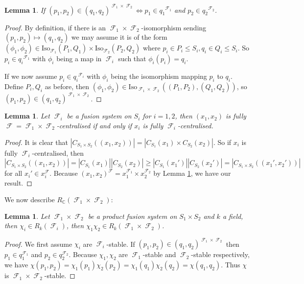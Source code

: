 \documentclass[12pt]{article}
\DeclareMathOperator{\C}{\mathbb{C}}
\DeclareMathOperator{\sF}{\mathcal{F}}
\theoremstyle{plain}
\newtheorem{lem}[thm]{Lemma}
\theoremstyle{definition}
\begin{document}
\begin{lem}\label{product classes}
If $(p_1, p_2) \in (q_1, q_2)^{\sF_1 \times \sF_2} \iff p_1 \in {q_1}^{\sF_1}$ and $p_2 \in {q_2}^{\sF_2}$.
\end{lem}
\begin{proof} By definition, if there is an $\sF_1\times\sF_2$-isomorphism sending $(p_1, p_2) \mapsto (q_1, q_2)$ we may assume it is of the form $(\phi_1, \phi_2) \in \text{Iso}_{\sF_1}(P_1, Q_1)\times\text{Iso}_{\sF_2}(P_2, Q_2)$ 
where $p_i \in P_i \leq S_i, q_i \in Q_i \leq S_i$. So $p_i \in {q_i}^{\sF_1}$ with $\phi_i$ being a map in $\sF_i$ such that $\phi_i(p_i) = q_i$.

If we now assume $p_i \in {q_i}^{\sF_i}$ with $\phi_i$ being the isomorphism mapping $p_i$ to $q_i$. Define $P_i, Q_i$ as before, 
then $(\phi_1, \phi_2) \in \text{Iso}_{\sF_1 \times \sF_2}((P_1, P_2), (Q_1, Q_2))$, so $(p_1, p_2) \in (q_1, q_2)^{\sF_1 \times \sF_2}$. 
\end{proof}

\begin{lem}\label{product centralised}
Let $\sF_i$ be a fusion system on $S_i$ for $i = 1,2$, then $(x_1,x_2)$ is fully $\sF=\sF_1 \times \sF_2$-centralised if and only if $x_i$ is fully $\sF_i$-centralised.
\end{lem}
\begin{proof}
It is clear that $|C_{S_1 \times S_2}((x_1, x_2))| = |C_{S_1}(x_1) \times C_{S_2}(x_2)|$. So if $x_i$ is fully $\sF_i$-centralised, then 
$|C_{S_1 \times S_2}((x_1, x_2))| =|C_{S_1}(x_1)||C_{S_2}(x_2)| \geq |C_{S_1}(x_1')||C_{S_2}(x_2')| = |C_{S_1 \times S_2}((x_1', x_2'))|$ 
for all $x_i' \in x_i^{\sF}$. Because $(x_1, x_2)^{\sF} = x_1^{\sF_1} \times x_2^{\sF_2}$ by Lemma \ref{product classes}, we have our result.
\end{proof}

We now describe $R_{\C}(\sF_1 \times \sF_2)$:
\begin{lem}\label{product is f-stable}
Let $\sF_1 \times \sF_2$ be a product fusion system on $S_1 \times S_2$ and $k$ a field, then $\chi_i \in R_{k}(\sF_i)$, then $\chi_1\chi_2 \in R_{k}(\sF_1 \times \sF_2)$.
\end{lem}
\begin{proof}
We first assume $\chi_i$ are $\sF_i$-stable. If $(p_1, p_2) \in (q_1, q_2)^{\sF_1\times\sF_2}$ then $p_1 \in q_1^{\sF_1}$ and $p_2 \in q_2^{\sF_2}$. 
Because  $\chi_1, \chi_2$ are $\sF_1$-stable and $\sF_2$-stable respectively, we have $\chi(p_1, p_2) = \chi_1(p_1)\chi_2(p_2) = \chi_1(q_1)\chi_2(q_2) = \chi(q_1, q_2)$. Thus $\chi$ is $\sF_1\times\sF_2$-stable. 
\end{proof}
\end{document}

